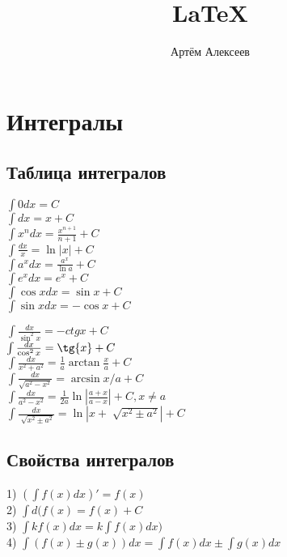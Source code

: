 \documentclass[12pt,a4paper]{article}
\title{\LaTeX}
\date{}
\author{Артём Алексеев}
\begin{document}
  

\section{Интегралы}
\subsection{Таблица интегралов}

\begin{minipage}{0.4\textwidth}
\begin{flushleft}
$ \int{0dx} = C $ \\
$ \int{dx} = x + C $ \\ 
$ \int{x^n dx} = \frac{x^{n+1}}{n+1} + C $ \\
$ \int{\frac{dx}{x}} = \ln{|x|} + C $ \\
$ \int{a^x dx} = \frac{a^x}{\ln{a}} + C $ \\
$ \int{e^x dx} = e^x + C $ \\ 
$ \int{\cos{x}dx} = \sin{x} + C $ \\
$ \int{\sin{x}dx} = -\cos{x} + C $
\end{flushleft}
\end{minipage}
\hfill
\begin{minipage}{0.5\textwidth}
\begin{flushleft}
$ \int{\frac{dx}{\sin^2{x}}} = -ctg{x} + C $ \\
$ \int{\frac{dx}{\cos^2{x}}} = \tg{x} + C $ \\
$ \int{\frac{dx}{x^2+a^2}} = \frac{1}{a} \arctan \frac{x}{a} + C $ \\
$ \int{\frac{dx}{\sqrt{a^2-x^2}}} = \arcsin{x/a} + C $ \\
$ \int{\frac{dx}{a^2-x^2}}=\frac{1}{2a}\ln{|\frac{a+x}{a-x}|} + C, x \neq a $ \\
$ \int{\frac{dx}{\sqrt[]{x^2 \pm a^2}}} = \ln{|x + \sqrt[]{x^2 \pm a^2}|} + C $
\end{flushleft}
\end{minipage}

\subsection{Свойства интегралов}
1) $ (\int{f(x)dx})' = f(x) $ \\
2) $ \int{d(f(x)} = f(x) + C $ \\
3) $ \int{k f(x)dx} = k \int{f(x)dx)} $ \\
4) $ \int{(f(x) \pm g(x))dx} = \int{f(x)dx} \pm \int{g(x)dx}$
\end{document}
